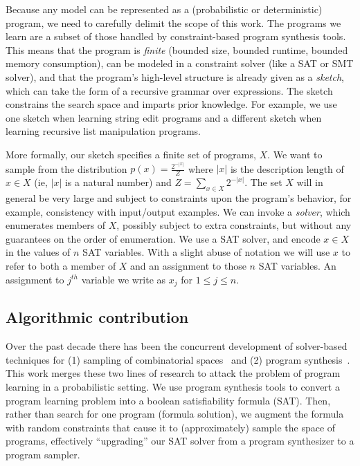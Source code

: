 \documentclass{article}
\begin{document}
Because any model can be represented as a (probabilistic or deterministic) program,
we need to carefully delimit
the scope of this work.
The programs we learn are a subset of those handled by constraint-based program synthesis tools.
This means that the program is \emph{finite} (bounded size, bounded runtime, bounded memory consumption),
can be modeled in a constraint solver (like a SAT or SMT solver),
and that the program's high-level structure is already given as a \emph{sketch},~\cite{solar2008program}
which can take the form of a recursive grammar over expressions.
The sketch constrains the search space and imparts prior knowledge.
For example,
we use one sketch when learning string edit programs and a different sketch when learning recursive list manipulation programs.

More formally, our sketch specifies  a finite set of programs, $X$.
We want to sample from the distribution $p(x) = \frac{2^{-|x|}}{Z}$ where $|x|$
is the description length of $x\in X$ (ie, $|x|$ is a natural number) and 
$Z = \sum_{x\in X} 2^{-|x|}$.
The set $X$ will in general be very large and subject to constraints upon the program's behavior, for example,
consistency with input/output examples.
We can invoke a \emph{solver}, which enumerates members of $X$, possibly subject to extra constraints,
but without any guarantees on the order of enumeration.
We use a SAT solver,
and encode $x\in X$ in the values of $n$ SAT variables.
With a slight abuse of notation we will use $x$ to refer to both a member of $X$ and an assignment to those $n$ SAT variables.
An assignment to $j^{th}$ variable we write as $x_j$ for $1\leq j\leq n$.

\subsection{Algorithmic contribution}
Over the past decade there has been the concurrent development of solver-based%
 techniques for (1) sampling of combinatorial spaces~\cite{gomes2006near,ermon2013embed,ermon2012uniform,chakraborty2014balancing} and (2) program synthesis~\cite{solar2008program,Gulwani:2011:SLP:1993498.1993506}.
This work merges these two lines of research to attack the problem of program learning in a probabilistic setting.
We use program synthesis tools to convert a program learning problem into a boolean satisfiability formula (SAT).
Then,
rather than search for one program (formula solution),
we augment the formula with random constraints that cause it to (approximately) sample the space of programs,
effectively ``upgrading'' our SAT solver from a program synthesizer to a program sampler.
\end{document}
